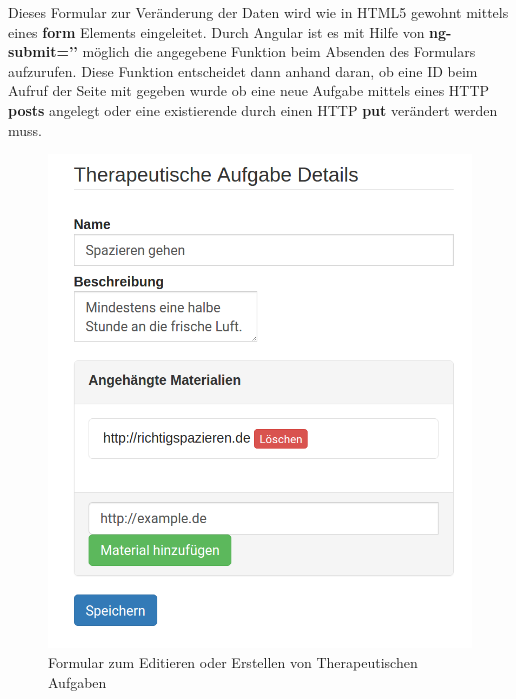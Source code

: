 Dieses Formular zur Veränderung der Daten wird wie in HTML5 gewohnt mittels eines \textbf{form} Elements eingeleitet. Durch Angular ist es mit Hilfe von \textbf{ng-submit=’’} möglich die angegebene Funktion beim Absenden des Formulars aufzurufen. Diese Funktion entscheidet dann anhand daran, ob eine ID beim Aufruf der Seite mit gegeben wurde ob eine neue Aufgabe mittels eines HTTP \textbf{posts} angelegt oder eine existierende durch einen HTTP \textbf{put} verändert werden muss.

\begin{figure}[H]
	\centering
	\includegraphics[scale=0.25]{images/Screenshots/TherapeutischeAufgabeDetail}
	\caption[Formular zum Editieren oder Erstellen von Therapeutischen Aufgaben]{Formular zum Editieren oder Erstellen von Therapeutischen Aufgaben}
	\label{TherapeutischeAufgabeDetail}
\end{figure}

\newpage
